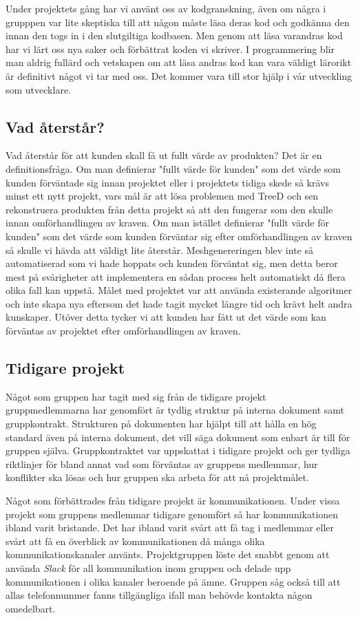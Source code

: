 Under projektets gång har vi använt oss av kodgranskning, även om några i grupppen var lite skeptiska till att någon måste läsa deras kod och godkänna den innan den togs in i den slutgiltiga kodbasen. Men genom att läsa varandras kod har vi lärt oss nya saker och förbättrat koden vi skriver. I programmering blir man aldrig fullärd och vetskapen om att läsa andras kod kan vara väldigt lärorikt är definitivt något vi tar med oss. Det kommer vara till stor hjälp i vår utveckling som utvecklare.


\subsection{Vad återstår?}
Vad återstår för att kunden skall få ut fullt värde av produkten? Det är en definitionsfråga. Om man definierar "fullt värde för kunden" som det värde som kunden förväntade sig innan projektet eller i projektets tidiga skede så krävs minst ett nytt projekt, vars mål är att lösa problemen med TreeD och sen rekonstruera produkten från detta projekt så att den fungerar som den skulle innan omförhandlingen av kraven. Om man istället definierar "fullt värde för kunden" som det värde som kunden förväntar sig efter omförhandlingen av kraven så skulle vi hävda att väldigt lite återstår. Meshgenereringen blev inte så automatiserad som vi hade hoppats och kunden förväntat sig, men detta beror mest på svårigheter att implementera en sådan process helt automatiskt då flera olika fall kan uppstå. Målet med projektet var att använda existerande algoritmer och inte skapa nya eftersom det hade tagit mycket längre tid och krävt helt andra kunskaper. Utöver detta tycker vi att kunden har fått ut det värde som kan förväntas av projektet efter omförhandlingen av kraven.


\subsection{Tidigare projekt}
Något som gruppen har tagit med sig från de tidigare projekt gruppmedlemmarna har genomfört är tydlig struktur på interna dokument samt gruppkontrakt. Strukturen på dokumenten har hjälpt till att hålla en hög standard även på interna dokument, det vill säga dokument som enbart är till för gruppen själva. Gruppkontraktet var uppskattat i tidigare projekt och ger tydliga riktlinjer för bland annat vad som förväntas av gruppens medlemmar, hur konflikter ska lösas och hur gruppen ska arbeta för att nå projektmålet.

Något som förbättrades från tidigare projekt är kommunikationen. Under vissa projekt som gruppens medlemmar tidigare genomfört så har kommunikationen ibland varit bristande. Det har ibland varit svårt att få tag i medlemmar eller svårt att få en överblick av kommunikationen då många olika kommunikationskanaler använts. Projektgruppen löste det snabbt genom att använda \textit{Slack} för all kommunikation inom gruppen och delade upp kommunikationen i olika kanaler beroende på ämne. Gruppen såg också till att allas telefonnummer fanns tillgängliga ifall man behövde kontakta någon omedelbart.


